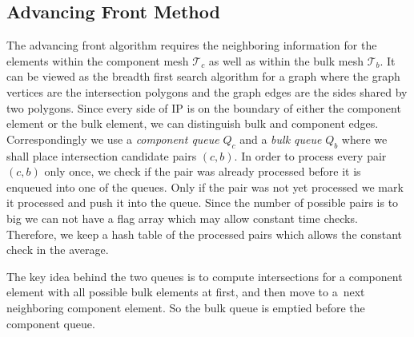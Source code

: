 \documentclass{elsarticle}
\newcommand{\noteJB}[1]{{\color{Blue} \textbf{JB: } \textit{#1}}}
\begin{document}
\subsection{Advancing Front Method}
\label{sec:front}
The advancing front algorithm requires the neighboring information for the elements within the component mesh $\mathcal T_c$ 
as well as within the bulk mesh $\mathcal T_b$. It can be viewed as the breadth first search algorithm for a graph where the graph vertices are 
the intersection polygons and the graph edges are the sides shared by two polygons. Since every side of IP is on the boundary of either 
the component element or the bulk element, we can distinguish bulk and component edges. 
Correspondingly we use a \emph{component queue} $Q_c$ and a \emph{bulk queue} $Q_b$ where we shall place intersection candidate pairs $(c,b)$.
In order to process every pair $(c,b)$ only once, we check if the pair was already processed before it is enqueued into one of the queues.
Only if the pair was not yet processed we mark it processed and push it into the queue. Since the number of possible pairs is to big we can not have a flag array
which may allow constant time checks. Therefore, we keep a hash table of the processed pairs which allows the constant check in the average.

The key idea behind the two queues is to compute intersections for a component element with all possible bulk elements at first,
and then move to a~next neighboring component element. So the bulk queue is emptied before the component queue.
%   
%             
%   
\end{document}
